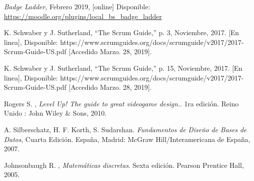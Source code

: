 \begin{thebibliography}{9}
        \textit{Badge Ladder,}
        Febrero 2019, [online] Disponible:  
        \url{https://moodle.org/plugins/local_bs_badge_ladder}


    
        K. Schwaber y J. Sutherland, “The Scrum Guide,” p. 3, Noviembre, 2017. [En linea], Disponible:
        https://www.scrumguides.org/docs/scrumguide/v2017/2017-Scrum-Guide-US.pdf [Accedido Marzo. 28, 2019].
        
        K. Schwaber y J. Sutherland, “The Scrum Guide,” p. 15, Noviembre, 2017. [En linea], Disponible:
        https://www.scrumguides.org/docs/scrumguide/v2017/2017-Scrum-Guide-US.pdf [Accedido Marzo. 28, 2019].
        
\begin{comment}
    \bibitem{conceptoDJLogros}
        Blair, Lucas \& Bowers, Clint \& Cannon-Bowers, Janis \& Gonzalez-Holland, Emily. {\it Understanding the Role of Achievements in Game-Based Learning. International Journal of Serious Games.} , December 2016 
    
\end{comment}    
    
        Rogers S. , \textit{Level Up! The guide to great videogame design.}. 1ra edición. Reino Unido : John Wiley \& Sons, 2010. 
        
        A. Silberschatz, H. F. Korth, S. Sudarshan. \textit{Fundamentos de Diseño de Bases de Datos}, Cuarta Edición. España, Madrid: McGraw Hill/Interamericana de España,  2007.
        
        Johnsonbaugh R. , \textit{Matemáticas discretas}. Sexta edición. Pearson Prentice Hall, 2005.
        

\end{thebibliography}
